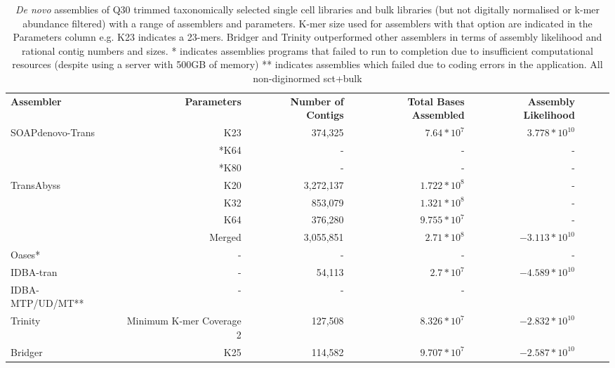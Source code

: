 \begin{table}[h]
    \begin{tabular}{|l|r r r r r r l}
        \textbf{Assembler} & \textbf{Parameters} & \textbf{Number of Contigs} & \textbf{Total Bases Assembled} & \textbf{Assembly Likelihood}\\
        SOAPdenovo-Trans & K23 & 374,325 & \(7.64*10^{7}\) & \(3.778*10^{10}\) \\
                         & *K64 & - & - & - \\  
                         & *K80 & - & - & - \\ 
        TransAbyss & K20 & 3,272,137 & \(1.722*10^{8}\)   & -  \\
                   & K32 & 853,079   & \( 1.321*10^{8}\)  & -  \\
                   & K64 & 376,280   & \( 9.755*10^{7}\)  & -  \\
                   & Merged & 3,055,851 & \(2.71*10^{8}\) & \(-3.113*10^{10}\)  \\
        Oases*     & - & - & - & - \\
        IDBA-tran      & - & 54,113 & \(2.7*10^{7}\) & \(-4.589*10^{10}\)\\
        IDBA-MTP/UD/MT** & - & - & - & \\
        Trinity & Minimum K-mer Coverage 2 & 127,508 &  \( 8.326*10^{7}\) & \(-2.832*10^{10}\) \\
        Bridger & K25 & 114,582 & \( 9.707*10^{7}\)  & \(-2.587*10^{10}\)\\ 
    \end{tabular}
    \caption{\textit{De novo} assemblies of Q30 trimmed taxonomically
        selected single cell libraries and bulk libraries (but not digitally normalised or k-mer abundance
            filtered) with a range of assemblers and parameters.  K-mer size used
            for assemblers with that option are indicated in the Parameters column 
            e.g. K23 indicates a 23-mers. Bridger and Trinity outperformed 
            other assemblers in terms of assembly likelihood and rational
            contig numbers and sizes.
        * indicates assemblies programs that failed to run to completion due to 
        insufficient computational resources (despite using a server with 500GB 
        of memory)
        ** indicates assemblies which failed due to coding errors in the application.
        All non-diginormed sct+bulk}
        \label{tab:assemblies}
\end{table}

